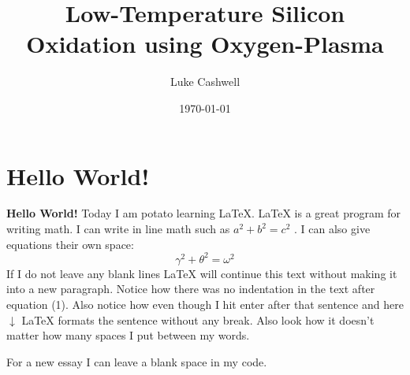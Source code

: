 \documentclass{IEEEtran} %
\title{Low-Temperature Silicon Oxidation using Oxygen-Plasma} %
\author{Luke Cashwell} %
\date{\today} %
\begin{document}
\maketitle %

\section{Hello World!} %

\textbf{Hello World!} Today I am potato learning \LaTeX. %
\LaTeX{} is a great program for writing math. I can write in line math such as $a^2+b^2=c^2$ %
. I can also give equations their own space:
\begin{equation} %
  \gamma^2+\theta^2=\omega^2
\end{equation}
If I do not leave any blank lines \LaTeX{} will continue  this text without making it into a new paragraph.  Notice how there was no indentation in the text after equation (1).
Also notice how even though I hit enter after that sentence and here $\downarrow$
\LaTeX{} formats the sentence without any break.  Also   look  how      it   doesn't     matter          how    many  spaces     I put     between       my    words.

For a new essay I can leave a blank space in my code.
\end{document}
